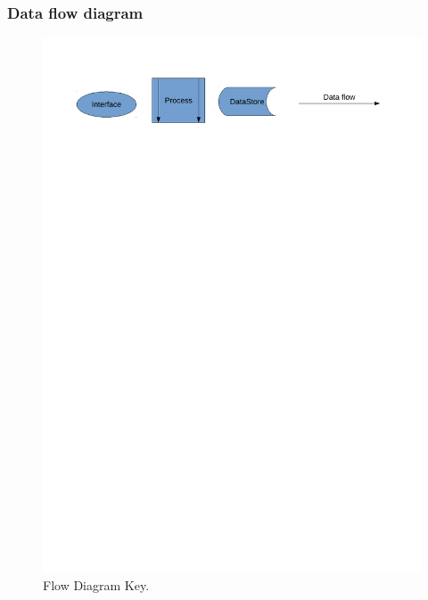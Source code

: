 \documentclass[a4paper,12pt]{report}
\begin{document}
\subsubsection{Data flow diagram}

\begin{figure}[H]
    \caption{Flow Diagram Key.} \label{fig:print_function_result}
    \includegraphics[width=\textwidth]{./Dataflow/DFD_analysis_key.pdf}
\end{figure}
\end{document}
